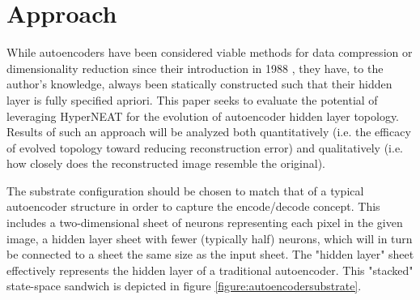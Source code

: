 \documentclass{acm_proc_article-sp}
\begin{document}
\section{Approach}
While autoencoders have been considered viable methods for data compression or dimensionality reduction since their introduction in 1988 \cite{bourland1988}, they have, to the author's knowledge, always been statically constructed such that their hidden layer is fully specified apriori.  This paper seeks to evaluate the potential of leveraging HyperNEAT for the evolution of autoencoder hidden layer topology.  Results of such an approach will be analyzed both quantitatively (i.e. the efficacy of evolved topology toward reducing reconstruction error) and qualitatively (i.e. how closely does the reconstructed image resemble the original).

The substrate configuration should be chosen to match that of a typical autoencoder structure in order to capture the encode/decode concept.  This includes a two-dimensional sheet of neurons representing each pixel in the given image, a hidden layer sheet with fewer (typically half) neurons, which will in turn be connected to a sheet the same size as the input sheet.  The "hidden layer" sheet effectively represents the hidden layer of a traditional autoencoder.  This "stacked" state-space sandwich is depicted in figure \ref{figure:autoencodersubstrate}.
\end{document}
